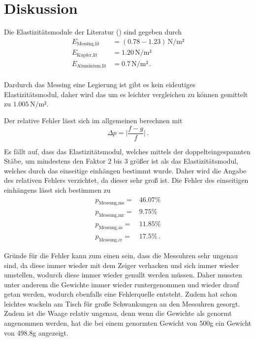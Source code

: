 \newpage
\section{Diskussion}
\label{sec:Diskussion}

Die Elastizitätsmodule der Literatur (\cite{Elastizitätsmodul}) sind gegeben durch
\begin{align*}
     E_\text{Messing,lit} &= (0.78 - 1.23)  \, \si{\newton\per\meter²}\\
     E_\text{Kupfer,lit} &= 1.20 \, \si{\newton\per\meter²}\\
     E_\text{Aluminium,lit} &= 0.7 \, \si{\newton\per\meter²} \, . \\
\end{align*} 

Dardurch das Messing eine Legierung ist gibt es kein eideutiges Elastizitätsmodul, daher wird das um es leichter vergleichen zu können gemittelt zu $1.005 \, \si{\newton\per\meter²}$.

\noindent
Der relative Fehler lässt sich im allgemeinen berechnen mit 
\begin{equation*}
    \Delta p = \bigg |\frac{f-g}{f} \bigg | \, .
\end{equation*}

Es fällt auf, dass das Elastizitätsmodul, welches mittels der doppelteingespannten Stäbe, um mindestens den Faktor 2 bis 3 größer ist als das Elastizitätsmodul, welches
durch das einseitige einhängen bestimmt wurde. Daher wird die Angabe des relativen Fehlers verzichtet, da dieser sehr groß ist.
Die Fehler des einseitigen einhängens lässt sich bestimmen zu
\begin{align*}
    p_\text{Messung,ms} =& 46.07 \si{\percent}   \\
    p_\text{Messung,mr} =& 9.75 \si{\percent}  \\
    p_\text{Messung,as} =& 11.85 \si{\percent}\\
    p_\text{Messung,cr} =& 17.5 \si{\percent} \, .
\end{align*}

\noindent
Gründe für die Fehler kann zum einen sein, dass die Messuhren sehr ungenau sind, da diese immer wieder mit dem Zeiger verhacken und sich immer wieder umstellen, wodurch 
diese immer wieder genullt werden müssen. Daher mussten unter anderem die Gewichte immer wieder runtergenommen und wieder drauf getan werden, wodurch ebenfalls eine Fehlerquelle
entsteht.  Zudem hat schon leichtes wackeln am Tisch für große Schwankungen an den Messuhren gesorgt.
Zudem ist die Waage relativ ungenau, denn wenn die Gewichte als genormt angenommen werden, hat die bei einem genormten Gewicht von 500g ein Gewicht von 498.8g angezeigt. 

